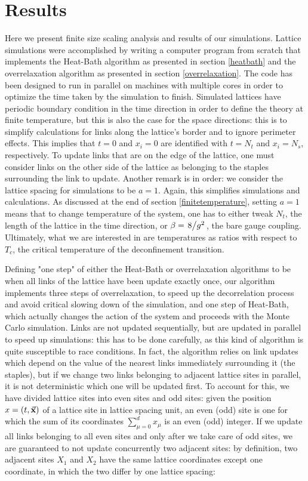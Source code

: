 \documentclass[reqno,12pt]{article}
\numberwithin{equation}{section}
\begin{document}
\section{Results} \label{results}

Here we present finite size scaling analysis and results of our simulations. Lattice simulations were accomplished
by writing a computer program from scratch that implements the Heat-Bath algorithm as presented in section
\ref{heatbath} and the overrelaxation algorithm as presented in section \ref{overrelaxation}. 
The code has been designed to run in parallel on machines with multiple cores in order to
optimize the time taken by the simulation to finish. Simulated lattices have periodic boundary condition in the time
direction in order to define the theory at finite temperature, but this is also the case for the space directions:
this is to simplify calculations for links along the lattice's border and to ignore perimeter effects. This implies
that $t = 0$ and $x_i = 0$ are identified with $t = N_t$ and $x_i = N_s$, respectively.
To update links that are on the edge of the lattice, one must consider links on the other side of the lattice as 
belonging to the staples surrounding the link to update. Another remark is in order: we consider the lattice spacing
for simulations to be $a = 1$. Again, this simplifies simulations and calculations. As discussed at the end of
section \ref{finitetemperature}, setting $a = 1$ means that to change temperature of the system, one has to either
tweak $N_t$, the length of the lattice in the time direction, or $\beta = \flatfrac{8}{g^2}$, the bare gauge
coupling. Ultimately, what we are interested in are temperatures as ratios with respect to $T_c$, the critical 
temperature of the deconfinement transition.

Defining "one step" of either the Heat-Bath or overrelaxation algorithms to be when all links of the lattice
have been update exactly once, our algorithm implements three steps of overrelaxation, to speed up the
decorrelation process and avoid critical slowing down of the simulation, and one step of Heat-Bath, which 
actually changes the action of the system and proceeds with the Monte Carlo simulation. Links are not updated
sequentially, but are updated in parallel to speed up simulations: this has to be done carefully, as this kind
of algorithm is quite susceptible to race conditions. In fact, the algorithm relies on link updates which
depend on the value of the nearest links immediately surrounding it (the staples), but if we change two links
belonging to adjacent lattice sites in parallel, it is not deterministic which one will be updated first. To 
account for this, we have divided lattice sites into even sites and odd sites: given the position 
$x = (t, \va{x})$ of a lattice site in lattice spacing unit, an even (odd) site is one for which the sum of its coordinates
$\sum_{\mu = 0}^d x_\mu$ is an even (odd) integer. If we update all links belonging to all even sites and only
after we take care of odd sites, we are guaranteed to not update concurrently two adjacent sites: by definition,
two adjacent sites $X_1$ and $X_2$ have the same lattice coordinates except one coordinate, in which
the two differ by one lattice spacing:
\end{document}
